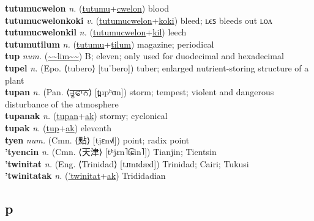 \textbf{tutumucwelon} \textit{n.} (\hyperref[tutumu]{tutumu}+\hyperref[cwelon]{cwelon})
blood \label{tutumucwelon} \\
\textbf{tutumucwelonkoki} \textit{v.} (\hyperref[tutumucwelon]{tutumucwelon}+\hyperref[koki]{koki})
bleed; ʟєꜱ bleeds out ʟᴏᴧ \label{tutumucwelonkoki} \\
\textbf{tutumucwelonkil} \textit{n.} (\hyperref[tutumucwelon]{tutumucwelon}+\hyperref[kil]{kil})
leech \label{tutumucwelonkil} \\
\textbf{tutumutilum} \textit{n.} (\hyperref[tutumu]{tutumu}+\hyperref[tilum]{tilum})
magazine; periodical \label{tutumutilum} \\
\textbf{tup} \textit{num.} (\hyperref[lim]{\~{}\~{}lim\~{}\~{}})
B; eleven; only used for duodecimal and hexadecimal \label{tup} \\
\textbf{tupel} \textit{n.} (Epo. ⟨tubero⟩ [tuˈbero])
tuber; enlarged nutrient-storing structure of a plant \label{tupel} \\
\textbf{tupan} \textit{n.} (Pan. ⟨ਤੂਫਾਨ⟩ [t̪upʰɑn])
storm; tempest; violent and dangerous disturbance of the atmosphere \label{tupan} \\
\textbf{tupanak} \textit{n.} (\hyperref[tupan]{tupan}+\hyperref[ak]{ak})
stormy; cyclonical \label{tupanak} \\
\textbf{tupak} \textit{n.} (\hyperref[tup]{tup}+\hyperref[ak]{ak})
eleventh \label{tupak} \\
\textbf{tyen} \textit{num.} (Cmn. ⟨點⟩ [tjɛn˧˩˥])
point; radix point \label{tyen} \\
\textbf{'tyencin} \textit{n.} (Cmn. ⟨天津⟩ [tʰjɛn˥t͡ɕin˥])
Tianjin; Tientsin \label{'tyencin} \\
\textbf{'twinitat} \textit{n.} (Eng. ⟨Trinidad⟩ [tɹɪnɪdæd])
Trinidad; Cairi; Tukusi \label{'twinitat} \\
\textbf{'twinitatak} \textit{n.} (\hyperref['twinitat]{'twinitat}+\hyperref[ak]{ak})
Trididadian \label{'twinitatak} \\
\subsection{p}

